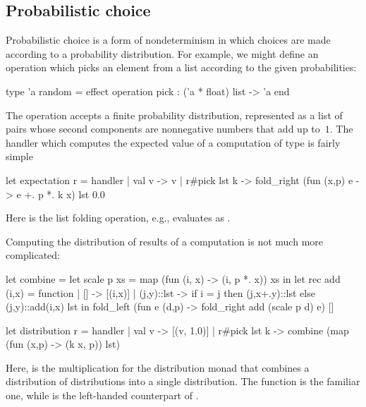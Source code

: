\subsection{Probabilistic choice}

Probabilistic choice is a form of nondeterminism in which choices are made according to a probability distribution. For example, we might define an operation which picks an element from a list according to the given probabilities:
%
\begin{source}
type 'a random = effect
  operation pick : ('a * float) list -> 'a
end
\end{source}
%
The operation  accepts a finite probability distribution, represented as a list of pairs whose second components are nonnegative numbers that add up to~$1$. The handler which computes the expected value of a computation of type  is fairly simple
%
\begin{source}
let expectation r = handler
  | val v -> v
  | r#pick lst k ->
      fold_right (fun (x,p) e -> e +. p *. k x) lst 0.0
\end{source}
%
Here  is the list folding operation, e.g.,  evaluates as .

Computing the distribution of results of a computation is not much more complicated:
%
\begin{source}
let combine =
  let scale p xs = map (fun (i, x) -> (i, p *. x)) xs in
  let rec add (i,x) = function
    | [] -> [(i,x)]
    | (j,y)::lst ->
      if i = j then (j,x+.y)::lst else (j,y)::add(i,x) lst
  in
    fold_left
      (fun e (d,p) -> fold_right add (scale p d) e) []

let distribution r = handler
  | val v -> [(v, 1.0)]
  | r#pick lst k ->
      combine (map (fun (x,p) -> (k x, p)) lst)
\end{source}
%
Here,  is the multiplication for the distribution monad that combines a distribution of distributions into a single distribution. The function  is the familiar one, while  is the left-handed counterpart of .

